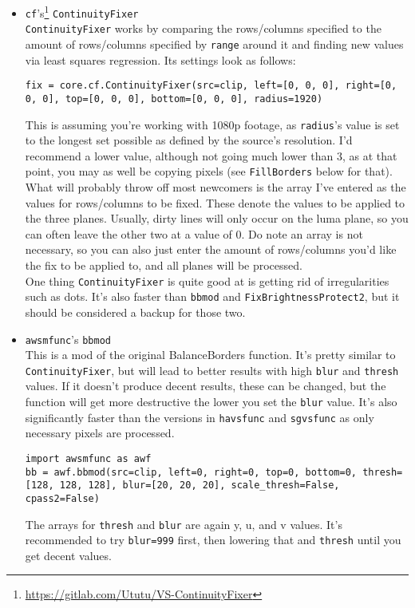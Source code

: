 \documentclass{scrartcl}
\begin{document}
\begin{itemize}
\item \texttt{cf}'s\footnote{\url{https://gitlab.com/Ututu/VS-ContinuityFixer}} \texttt{ContinuityFixer}\\
\texttt{ContinuityFixer} works by comparing the rows/columns specified to the amount of rows/columns specified by \texttt{range} around it and finding new values via least squares regression.  Its settings look as follows:
\begin{lstlisting}
fix = core.cf.ContinuityFixer(src=clip, left=[0, 0, 0], right=[0, 0, 0], top=[0, 0, 0], bottom=[0, 0, 0], radius=1920)
\end{lstlisting}
This is assuming you're working with 1080p footage, as \texttt{radius}'s value is set to the longest set possible as defined by the source's resolution.  I'd recommend a lower value, although not going much lower than $3$, as at that point, you may as well be copying pixels (see \texttt{FillBorders} below for that). What will probably throw off most newcomers is the array I've entered as the values for rows/columns to be fixed.  These denote the values to be applied to the three planes.  Usually, dirty lines will only occur on the luma plane, so you can often leave the other two at a value of 0.  Do note an array is not necessary, so you can also just enter the amount of rows/columns you'd like the fix to be applied to, and all planes will be processed.\\
One thing \texttt{ContinuityFixer} is quite good at is getting rid of irregularities such as dots. It's also faster than \texttt{bbmod} and \texttt{FixBrightnessProtect2}, but it should be considered a backup for those two.
\item \texttt{awsmfunc}'s \texttt{bbmod}\\
This is a mod of the original BalanceBorders function.  It's pretty similar to \texttt{ContinuityFixer}, but will lead to better results with high \texttt{blur} and \texttt{thresh} values.  If it doesn't produce decent results, these can be changed, but the function will get more destructive the lower you set the \texttt{blur} value.  It's also significantly faster than the versions in \texttt{havsfunc} and \texttt{sgvsfunc} as only necessary pixels are processed.
\begin{lstlisting}
import awsmfunc as awf
bb = awf.bbmod(src=clip, left=0, right=0, top=0, bottom=0, thresh=[128, 128, 128], blur=[20, 20, 20], scale_thresh=False, cpass2=False)
\end{lstlisting}
The arrays for \texttt{thresh} and \texttt{blur} are again y, u, and v values. It's recommended to try \texttt{blur=999} first, then lowering that and \texttt{thresh} until you get decent values.\\

\end{itemize}
\end{document}
